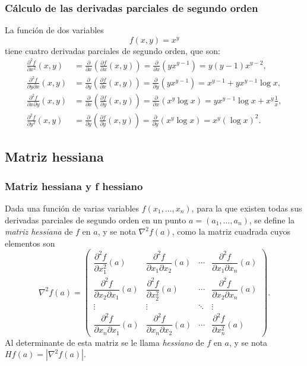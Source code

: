 \begin{frame}
\frametitle{Cálculo de las derivadas parciales de segundo orden}
La función de dos variables
\[f(x,y)=x^y\]
tiene cuatro derivadas parciales de segundo orden, que son:
\begin{align*}
\frac{\partial^2 f}{\partial x^2}(x,y) &=
\frac{\partial}{\partial x}\left(\frac{\partial f}{\partial x}(x,y)\right) =
\frac{\partial}{\partial x}\left(yx^{y-1}\right) =
y(y-1)x^{y-2},\\
\frac{\partial^2 f}{\partial y \partial x}(x,y) &=
\frac{\partial}{\partial y}\left(\frac{\partial f}{\partial x}(x,y)\right) =
\frac{\partial}{\partial y}\left(yx^{y-1}\right) =
x^{y-1}+yx^{y-1}\log x,\\
\frac{\partial^2 f}{\partial x \partial y}(x,y) &=
\frac{\partial}{\partial x}\left(\frac{\partial f}{\partial y}(x,y)\right) =
\frac{\partial}{\partial x}\left(x^y\log x \right) =
yx^{y-1}\log x+x^y\frac{1}{x},\\
\frac{\partial^2 f}{\partial y^2}(x,y) &=
\frac{\partial}{\partial y}\left(\frac{\partial f}{\partial y}(x,y)\right) =
\frac{\partial}{\partial y}\left(x^y\log x \right) =
x^y(\log x)^2.
\end{align*}
\end{frame}


\subsection{Matriz hessiana}
\begin{frame}
\frametitle{Matriz hessiana y f hessiano}
\begin{definicion}
Dada una función de varias variables $f(x_1,\ldots,x_n)$, para la que existen todas sus derivadas parciales de segundo
orden en un punto $a=(a_1,\ldots,a_n)$, se define la \emph{matriz hessiana} de $f$ en $a$, y se nota $\nabla^2f(a)$, como la
matriz cuadrada cuyos elementos son
\[
\nabla^2f(a)=\left(
\begin{array}{cccc}
\dfrac{\partial^2 f}{\partial x_1^2}(a) & 
\dfrac{\partial^2 f}{\partial x_1 \partial x_2}(a) &
\cdots &
\dfrac{\partial^2 f}{\partial x_1 \partial x_n}(a)\\
\dfrac{\partial^2 f}{\partial x_2 \partial x_1}(a) &
\dfrac{\partial^2 f}{\partial x_2^2}(a) & 
\cdots &
\dfrac{\partial^2 f}{\partial x_2 \partial x_n}(a)\\
\vdots & \vdots & \ddots & \vdots \\
\dfrac{\partial^2 f}{\partial x_n \partial x_1}(a) &
\dfrac{\partial^2 f}{\partial x_n \partial x_2}(a) &
\cdots &
\dfrac{\partial^2 f}{\partial x_n^2}(a)
\end{array}
\right).
\]
Al determinante de esta matriz se le llama \emph{hessiano} de $f$ en $a$, y se nota $Hf(a)=|\nabla^2f(a)|$.
\end{definicion}
\end{frame}


